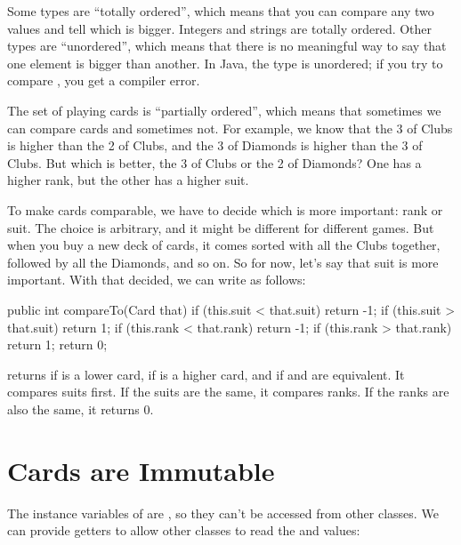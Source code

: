 
Some types are ``totally ordered'', which means that you can compare any two values and tell which is bigger.
Integers and strings are totally ordered.
Other types are ``unordered'', which means that there is no meaningful way to say that one element is bigger than another.
In Java, the  type is unordered; if you try to compare , you get a compiler error.

The set of playing cards is ``partially ordered'', which means that sometimes we can compare cards and sometimes not.
For example, we know that the 3 of Clubs is higher than the 2 of Clubs, and the 3 of Diamonds is higher than the 3 of Clubs.
But which is better, the 3 of Clubs or the 2 of Diamonds?
One has a higher rank, but the other has a higher suit.


To make cards comparable, we have to decide which is more important: rank or suit.
The choice is arbitrary, and it might be different for different games.
But when you buy a new deck of cards, it comes sorted with all the Clubs together, followed by all the Diamonds, and so on.
So for now, let's say that suit is more important.
With that decided, we can write  as follows:

\begin{code}
public int compareTo(Card that) {
    if (this.suit < that.suit) {
        return -1;
    }
    if (this.suit > that.suit) {
        return 1;
    }
    if (this.rank < that.rank) {
        return -1;
    }
    if (this.rank > that.rank) {
        return 1;
    }
    return 0;
}
\end{code}

 returns  if  is a lower card,  if  is a higher card, and  if  and  are equivalent.
It compares suits first.
If the suits are the same, it compares ranks.
If the ranks are also the same, it returns 0.


\section{Cards are Immutable}

The instance variables of  are , so they can't be accessed from other classes.
We can provide getters to allow other classes to read the  and  values:

